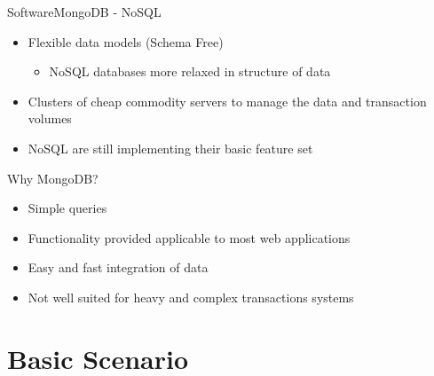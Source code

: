 \documentclass[11pt]{beamer}
\begin{document}
\begin{frame}{Software}{MongoDB - NoSQL}
\begin{itemize}
  \item Flexible data models (Schema Free)
    \begin{itemize}
      \item NoSQL databases more relaxed in structure of data
    \end{itemize}
    \item Clusters of cheap commodity servers to manage the data and transaction volumes
    \item NoSQL are still implementing their basic feature set
\end{itemize}

Why MongoDB?
\begin{itemize}
  \item Simple queries
  \item Functionality provided applicable to most web applications
  \item Easy and fast integration of data
  \item Not well suited for heavy and complex transactions systems
\end{itemize}
\end{frame}

\section{Basic Scenario}
\end{document}
